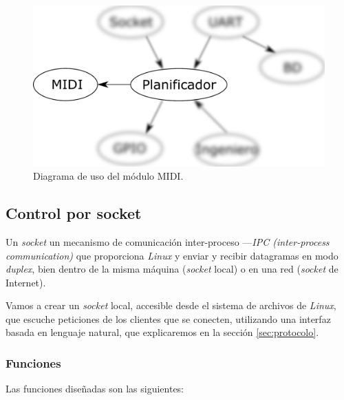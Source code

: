 \smallskip

\begin{figure}[H]
	\noindent \begin{centering}
		\includegraphics[width=\linewidth/2]{capitulo4/daemon_midi}
		\par\end{centering}
	\smallskip
	\caption{\label{fig:daemon_midi} Diagrama de uso del módulo MIDI.}
\end{figure} 

\smallskip

\subsection{Control por socket}
\label{subsec:daemon}

Un \textit{socket} un mecanismo de comunicación inter-proceso ---\textit{IPC (inter-process communication)} que proporciona \textit{Linux} y enviar y recibir datagramas en modo \textit{duplex}, bien dentro de la misma máquina (\textit{socket} local) o en una red (\textit{socket} de Internet).

Vamos a crear un \textit{socket} local, accesible desde el sistema de archivos de \textit{Linux}, que escuche peticiones de los clientes que se conecten, utilizando una interfaz basada en lenguaje natural, que explicaremos en la sección \ref{sec:protocolo}.

\subsubsection{Funciones}

Las funciones diseñadas son las siguientes:

